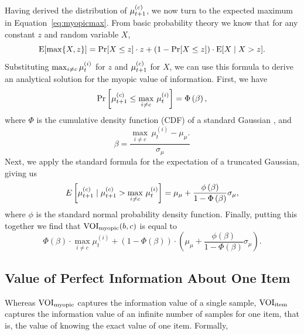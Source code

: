 Having derived the distribution of $\mu_{t+1}^{(c)}$, we now turn to the expected maximum in Equation~\ref{eq:myopicmax}. From basic probability theory we know that for any constant $z$ and random variable $X$,
%
\begin{equation}
  \label{eq:emaxtrick}
  \operatorname*{E}[\max\{X,z\}] = 
    \Pr[X\le z]\cdot z+
    (1-\Pr[X\le z]) 
    \cdot \operatorname*{E}[X\mid X>z].
\end{equation}
%
%
Substituting $\max_{i \neq c} \mu_t^{(i)}$ for $z$ and $\mu_{t+1}^{(c)}$ for $X$, we can use this formula to derive an analytical solution for the myopic value of information. First, we have
%
\begin{equation}
  \Pr\left[\mu_{t+1}^{(c)}\le \max_{i\neq c}\,\mu_t^{(i)}\right]=\Phi\left(\beta\right),
\end{equation}
%
where $\Phi$ is the cumulative density function (CDF) of a standard Gaussian , and 
%
\begin{equation}
  \beta=\frac{\max_{i\neq c}\,\mu_t^{(i)}-\mu_{\mu}.}{\sigma_{\mu}}
\end{equation}
%
Next, we apply the standard formula for the expectation of a truncated Gaussian, giving us
%
\begin{equation}
  E\left[\mu_{t+1}^{(c)}\mid\mu_{t+1}^{(c)}>\max_{i\neq c}\,\mu_t^{(i)}\right]=\mu_{\mu}+\frac{\phi\left(\beta\right)}{1-\Phi\left(\beta\right)}\sigma_{\mu},
\end{equation}
%
where $\phi$ is the standard normal probability density function.
Finally, putting this together we find that $\text{VOI}_\text{myopic}(b,c)$ is equal to
%
\begin{equation}
  \Phi(\beta)\cdot\max_{i\neq c}\mu_t^{(i)}+\left(1-\Phi(\beta)\right)\cdot\left(\mu_{\mu}+\frac{\phi\left(\beta\right)}{1-\Phi\left(\beta\right)}\sigma_{\mu}\right).
\end{equation}


\subsection{Value of Perfect Information About One Item}
Whereas $\text{VOI}_\text{myopic}$ captures the information value of a single sample, $\text{VOI}_\text{item}$ captures the information value of an infinite number of samples for one item, that is, the value of knowing the exact value of one item. Formally,

